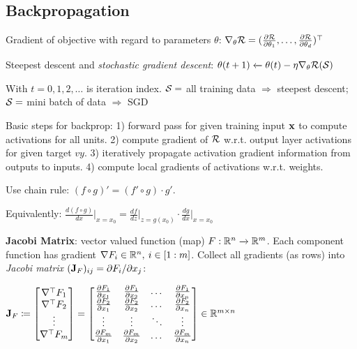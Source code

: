 \subsection{Backpropagation}
\label{sub:backpropagation}
    Gradient of objective with regard to parameters $\theta$: $\nabla_\theta\mathcal{R}=(\frac{\partial\mathcal{R}}{\partial\theta_1},\ldots,\frac{\partial\mathcal{R}}{\partial\theta_d})^{\mathop{\mathrm{\top}}}$
    
    Steepest descent and \emph{stochastic gradient descent}: $\theta(t+1)\xleftarrow{}\theta(t)-\eta\nabla_\theta\mathcal{R}(\mathcal{S})$
    
    With $t=0,1,2,\ldots$ is iteration index. $\mathcal{S}=$ all training data $\Rightarrow$ steepest descent; $\mathcal{S}=$ mini batch of data $\Rightarrow$ SGD
    
    Basic steps for backprop: 1) forward pass for given training input $\mathbf x$ to compute activations for all units. 2) compute gradient of $\mathcal{R}$ w.r.t. output layer activations for given target $vy$. 3) iteratively propagate activation gradient information from outputs to inputs. 4) compute local gradients of activations w.r.t. weights.
    
    Use chain rule: $(f\circ g)'=(f'\circ g)\cdot g'$. 
    
    Equivalently: $\frac{d(f\circ g)}{dx}\bigr|_{x=x_0}=\frac{df}{dz}\bigr|_{z=g(x_0)}\cdot\frac{dg}{dx}\bigr|_{x=x_0}$
    
    \textbf{Jacobi Matrix}: vector valued function (map) $F:\mathbb R^n\xrightarrow{}\mathbb R^m$. Each component function has gradient $\nabla F_i\in\mathbb R^n,\>i\in\lbrack1:m\rbrack$. Collect all gradients (as rows) into \emph{Jacobi matrix} $(\mathbf J_F)_{ij}=\partial F_i/\partial x_j$:
    
    \tab$\mathbf J_F\coloneqq
    \begin{bmatrix}
    \nabla^{\mathop{\mathrm{\top}}} F_1 \\
    \nabla^{\mathop{\mathrm{\top}}} F_2 \\
    \vdots \\
    \nabla^{\mathop{\mathrm{\top}}} F_m
    \end{bmatrix}
    =
    \begin{bmatrix}
    \frac{\partial F_1}{\partial x_1} & \frac{\partial F_1}{\partial x_2}  & \dots  & \frac{\partial F_1}{\partial x_n} \\
    \frac{\partial F_2}{\partial x_1} & \frac{\partial F_2}{\partial x_2}  & \dots  & \frac{\partial F_2}{\partial x_n} \\
    \vdots & \vdots  & \ddots & \vdots \\
    \frac{\partial F_m}{\partial x_1} & \frac{\partial F_m}{\partial x_2}  & \dots  & \frac{\partial F_m}{\partial x_n}
    \end{bmatrix}
    \in\mathbb R^{m\times n}
    $
    
